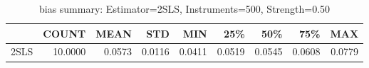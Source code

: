 \begin{table}[ht]
\centering
\caption{bias summary: Estimator=2SLS, Instruments=500, Strength=0.50}
\begin{tabular}{lrrrrrrrr}
\toprule
 & COUNT & MEAN & STD & MIN & 25\% & 50\% & 75\% & MAX \\
\midrule
2SLS & 10.0000 & 0.0573 & 0.0116 & 0.0411 & 0.0519 & 0.0545 & 0.0608 & 0.0779 \\
\bottomrule
\end{tabular}
\end{table}
